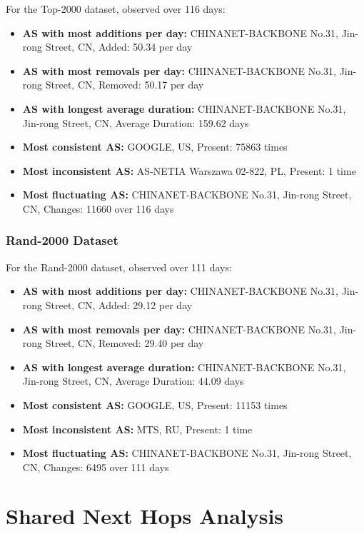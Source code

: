 \documentclass[12pt]{cwru_thesis}
\begin{document}
For the Top-2000 dataset, observed over 116 days:

\begin{itemize}
    \item \textbf{AS with most additions per day:} CHINANET-BACKBONE No.31, Jin-rong Street, CN, Added: 50.34 per day
    \item \textbf{AS with most removals per day:} CHINANET-BACKBONE No.31, Jin-rong Street, CN, Removed: 50.17 per day
    \item \textbf{AS with longest average duration:} CHINANET-BACKBONE No.31, Jin-rong Street, CN, Average Duration: 159.62 days
    \item \textbf{Most consistent AS:} GOOGLE, US, Present: 75863 times
    \item \textbf{Most inconsistent AS:} AS-NETIA Warszawa 02-822, PL, Present: 1 time
    \item \textbf{Most fluctuating AS:} CHINANET-BACKBONE No.31, Jin-rong Street, CN, Changes: 11660 over 116 days
\end{itemize}

\subsubsection{Rand-2000 Dataset}

For the Rand-2000 dataset, observed over 111 days:

\begin{itemize}
    \item \textbf{AS with most additions per day:} CHINANET-BACKBONE No.31, Jin-rong Street, CN, Added: 29.12 per day
    \item \textbf{AS with most removals per day:} CHINANET-BACKBONE No.31, Jin-rong Street, CN, Removed: 29.40 per day
    \item \textbf{AS with longest average duration:} CHINANET-BACKBONE No.31, Jin-rong Street, CN, Average Duration: 44.09 days
    \item \textbf{Most consistent AS:} GOOGLE, US, Present: 11153 times
    \item \textbf{Most inconsistent AS:} MTS, RU, Present: 1 time
    \item \textbf{Most fluctuating AS:} CHINANET-BACKBONE No.31, Jin-rong Street, CN, Changes: 6495 over 111 days
\end{itemize}

\section{Shared Next Hops Analysis}
\end{document}
